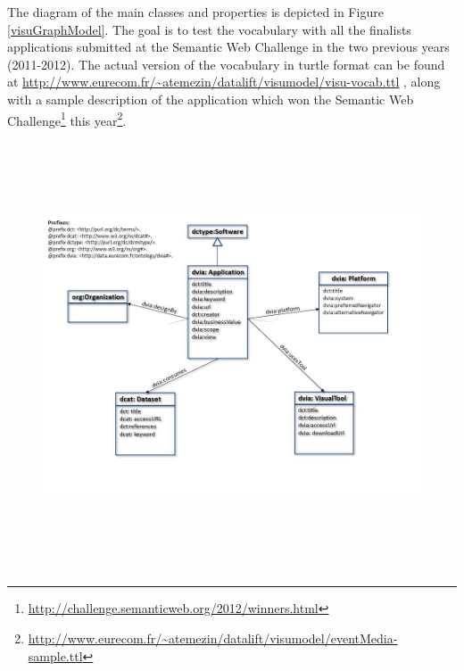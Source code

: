 \documentclass[a4paper,11pt]{report}
\begin{document}
The diagram of the main classes and properties is depicted in Figure \ref{visuGraphModel}. The goal is to test the vocabulary with all the finalists applications submitted at the Semantic Web Challenge in  the two previous years (2011-2012). The actual version of the vocabulary in turtle format can be found at \url{http://www.eurecom.fr/~atemezin/datalift/visumodel/visu-vocab.ttl} , along with a sample description of the application which won the Semantic Web Challenge\footnote{\url{http://challenge.semanticweb.org/2012/winners.html}} this year\footnote{\url{http://www.eurecom.fr/~atemezin/datalift/visumodel/eventMedia-sample.ttl}}.

\begin{landscape}
\begin{figure}[!htbp]
  \begin{center}
    \ifpdf
      \includegraphics[height=5in]{visuGraphModel.jpg}
    \else

\end{center}
\end{figure}
\end{landscape}
\end{document}
